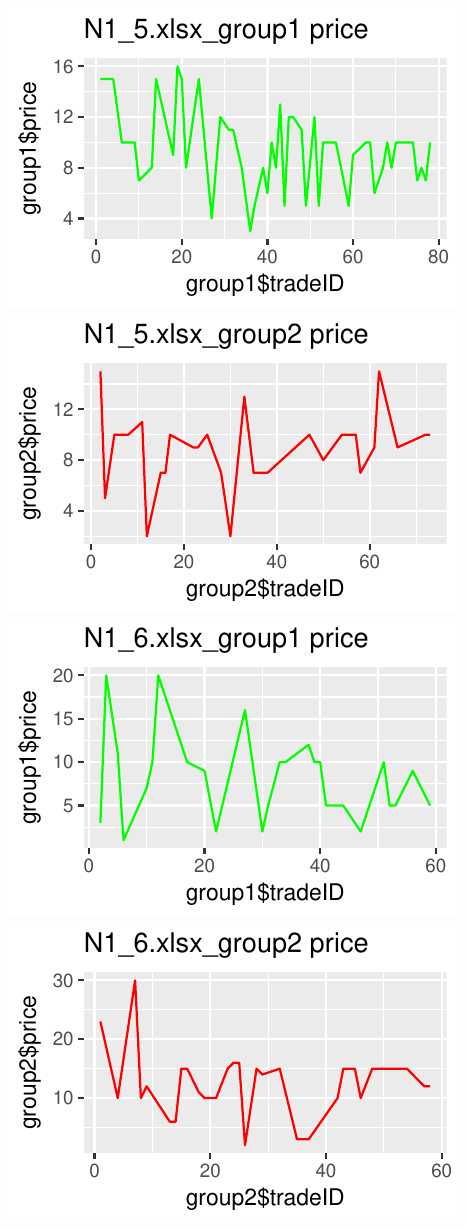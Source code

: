 \documentclass[]{article}
\begin{document}
\includegraphics{finance_homework_files/figure-latex/unnamed-chunk-4-9.pdf}
\includegraphics{finance_homework_files/figure-latex/unnamed-chunk-4-10.pdf}
\includegraphics{finance_homework_files/figure-latex/unnamed-chunk-4-11.pdf}
\includegraphics{finance_homework_files/figure-latex/unnamed-chunk-4-12.pdf}
\end{document}
